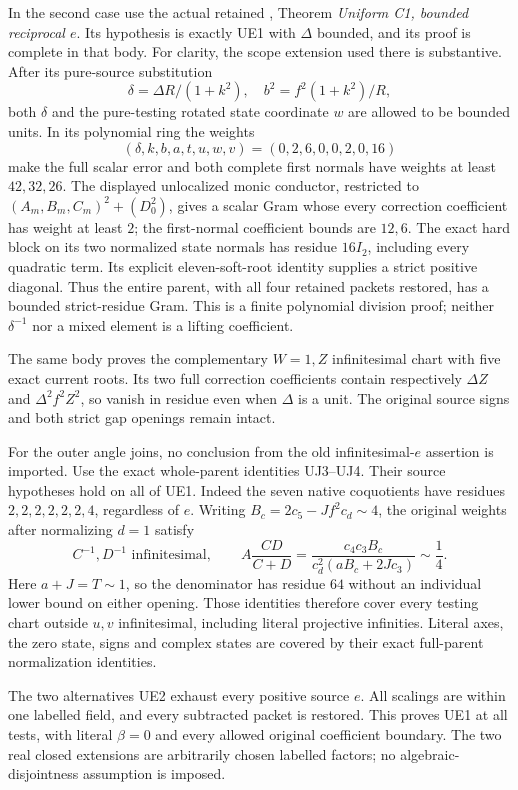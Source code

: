In the second case use the actual retained
, Theorem \emph{Uniform C1, bounded
reciprocal \(e\)}.  Its hypothesis is exactly UE1 with
\(\Delta\) bounded, and its proof is complete in that body.
For clarity, the scope extension used there is substantive.
After its pure-source substitution
\[
 \delta=\Delta R/(1+k^2),\quad b^2=f^2(1+k^2)/R,
\]
both \(\delta\) and the pure-testing rotated state coordinate \(w\)
are allowed to be bounded units.  In its polynomial ring the weights
\[
 (\delta,k,b,a,t,u,w,v)=(0,2,6,0,0,2,0,16)
 \tag{UE3}
\]
make the full scalar error and both complete first normals have weights
at least \(42,32,26\).  The displayed unlocalized monic conductor,
restricted to \((A_m,B_m,C_m)^2+(D_0^2)\), gives a scalar Gram
whose every correction coefficient has weight at least \(2\);
the first-normal coefficient bounds are \(12,6\).
The exact hard block on its two normalized state normals has
residue \(16I_2\), including every quadratic term.  Its explicit
eleven-soft-root identity supplies a strict positive diagonal.
Thus the entire parent, with all four retained packets restored,
has a bounded strict-residue Gram.  This is a finite polynomial
division proof; neither \(\delta^{-1}\) nor a mixed element is a
lifting coefficient.

The same body proves the complementary \(W=1,Z\) infinitesimal
chart with five exact current roots.  Its two full correction
coefficients contain respectively \(\Delta Z\) and
\(\Delta^2 f^2Z^2\), so vanish in residue even when \(\Delta\)
is a unit.  The original source signs and both strict gap openings
remain intact.

For the outer angle joins, no conclusion from the old infinitesimal-\(e\)
assertion is imported.  Use the exact whole-parent identities UJ3--UJ4.
Their source hypotheses hold on all of UE1.  Indeed the seven native
coquotients have residues \(2,2,2,2,2,2,4\), regardless of \(e\).
Writing \(B_c=2c_5-Jf^2c_d\sim4\), the original weights after
normalizing \(d=1\) satisfy
\[
 C^{-1},D^{-1}\text{ infinitesimal},\qquad
 A\frac{CD}{C+D}
 =\frac{c_4c_3B_c}{c_d^2(aB_c+2Jc_3)}\sim\frac14.
 \tag{UE4}
\]
Here \(a+J=T\sim1\), so the denominator has residue \(64\)
without an individual lower bound on either opening.
Those identities therefore cover every testing chart outside
\(u,v\) infinitesimal, including literal projective infinities.
Literal axes, the zero state, signs and complex states are covered
by their exact full-parent normalization identities.

The two alternatives UE2 exhaust every positive source \(e\).
All scalings are within one labelled field, and every subtracted
packet is restored.  This proves UE1 at all tests, with literal
\(\beta=0\) and every allowed original coefficient boundary.
The two real closed extensions are arbitrarily chosen labelled
factors; no algebraic-disjointness assumption is imposed.

